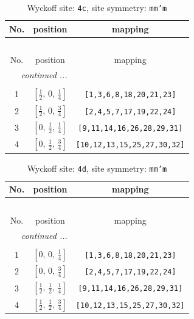 \documentclass[fleqn,8pt]{jsarticle}
\begin{document}
\renewcommand{\arraystretch}{1.2}
\begin{longtable}{ccc}
\caption{Wyckoff site: {\tt 4c}, site symmetry: {\tt mm'm}}
 \\
 \hline \hline
No. & position & mapping \\ \hline \endfirsthead

\multicolumn{2}{l}{\tablename\ \thetable{}} \\
 \hline \hline
No. & position & mapping \\ \hline \endhead

 \hline \hline
\multicolumn{2}{r}{\footnotesize\it continued ...} \\ \endfoot

 \hline \hline
\multicolumn{2}{r}{} \\ \endlastfoot

1 & $\left[ \frac{1}{2},\, 0,\, \frac{1}{4} \right]$ & {\tt [1,3,6,8,18,20,21,23]} \\ \hline
2 & $\left[ \frac{1}{2},\, 0,\, \frac{3}{4} \right]$ & {\tt [2,4,5,7,17,19,22,24]} \\ \hline
3 & $\left[ 0,\, \frac{1}{2},\, \frac{1}{4} \right]$ & {\tt [9,11,14,16,26,28,29,31]} \\ \hline
4 & $\left[ 0,\, \frac{1}{2},\, \frac{3}{4} \right]$ & {\tt [10,12,13,15,25,27,30,32]} \\
\end{longtable}
\renewcommand{\arraystretch}{1.2}
\begin{longtable}{ccc}
\caption{Wyckoff site: {\tt 4d}, site symmetry: {\tt mm'm}}
 \\
 \hline \hline
No. & position & mapping \\ \hline \endfirsthead

\multicolumn{2}{l}{\tablename\ \thetable{}} \\
 \hline \hline
No. & position & mapping \\ \hline \endhead

 \hline \hline
\multicolumn{2}{r}{\footnotesize\it continued ...} \\ \endfoot

 \hline \hline
\multicolumn{2}{r}{} \\ \endlastfoot

1 & $\left[ 0,\, 0,\, \frac{1}{4} \right]$ & {\tt [1,3,6,8,18,20,21,23]} \\ \hline
2 & $\left[ 0,\, 0,\, \frac{3}{4} \right]$ & {\tt [2,4,5,7,17,19,22,24]} \\ \hline
3 & $\left[ \frac{1}{2},\, \frac{1}{2},\, \frac{1}{4} \right]$ & {\tt [9,11,14,16,26,28,29,31]} \\ \hline
4 & $\left[ \frac{1}{2},\, \frac{1}{2},\, \frac{3}{4} \right]$ & {\tt [10,12,13,15,25,27,30,32]} \\
\end{longtable}
\end{document}
